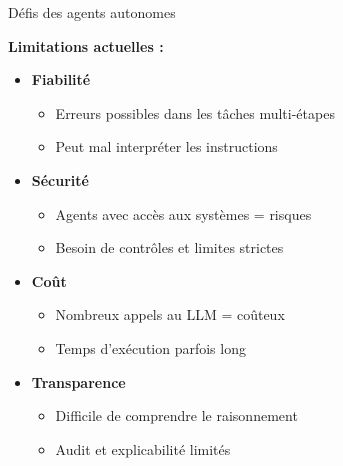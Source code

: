 \begin{frame}{Défis des agents autonomes}

\textbf{Limitations actuelles :}

\vspace{0.3cm}

\begin{itemize}
    \item<+-> \textbf{Fiabilité}
        \begin{itemize}
            \item Erreurs possibles dans les tâches multi-étapes
            \item Peut mal interpréter les instructions
        \end{itemize}
    
    \item<+-> \textbf{Sécurité}
        \begin{itemize}
            \item Agents avec accès aux systèmes = risques
            \item Besoin de contrôles et limites strictes
        \end{itemize}
    
    \item<+-> \textbf{Coût}
        \begin{itemize}
            \item Nombreux appels au LLM = coûteux
            \item Temps d'exécution parfois long
        \end{itemize}
    
    \item<+-> \textbf{Transparence}
        \begin{itemize}
            \item Difficile de comprendre le raisonnement
            \item Audit et explicabilité limités
        \end{itemize}
\end{itemize}

\end{frame}

